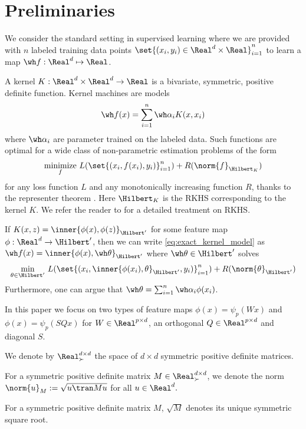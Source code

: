 \documentclass{article}
\def\cite{\citep}
\theoremstyle{plain}
\begin{document}
\section{Preliminaries}
\label{sec:prelim}

We consider the standard setting in supervised learning where we are provided with $n$ labeled training data points $\set{(x_i,y_i)\in\Real^d\times \Real}_{i=1}^n$ to learn a map $\wh f:\Real^d\mapsto\Real$.

A kernel $K:\Real^d\times \Real^d\to\Real$ is a bivariate, symmetric, positive definite function. Kernel machines are models
\begin{align}\label{eq:exact_kernel_model}
    \wh f(x)=\sum_{i=1}^n\wh\alpha_i K(x,x_i)
\end{align}
where $\wh\alpha_i$ are parameter trained on the labeled data.
Such functions are optimal for a wide class of non-parametric estimation problems of the form
\begin{align}\label{eq:representer_theorem}
\underset{f}{\text{minimize}}~ L(\set{(x_i,f(x_i),y_i)}_{i=1}^n) + R(\norm{f}_{\Hilbert_K})
\end{align}
for any loss function $L$ and any monotonically increasing function $R$, thanks to the representer theorem \cite{kimeldorf1971some,scholkopf2001generalized}. Here $\Hilbert_K$ is the RKHS corresponding to the kernel $K$. We refer the reader to \cite{steinwart2008support} for a detailed treatment on RKHS. 

If $K(x,z)=\inner{\phi(x),\phi(z)}_{\Hilbert'}$ for some feature map $ \phi:\Real^d\to\Hilbert'$, then we can write \cref{eq:exact_kernel_model} as $\wh f(x)=\inner{\phi(x),\wh\theta}_{\Hilbert'}$
where $\wh\theta\in\Hilbert'$ solves
\begin{align}\label{eq:featurized_glm}
    \underset{\theta\in\Hilbert'}{\text{min}}~ L(\set{(x_i,\inner{\phi(x_i),\theta}_{\Hilbert'},y_i)}_{i=1}^n) + R(\norm{\theta}_{\Hilbert'})
\end{align}
Furthermore, one can argue that $\wh\theta = \sum_{i=1}^n \wh\alpha_i\phi(x_i)$.

In this paper we focus on two types of feature maps $\phi(x)=\psi_p(Wx)$ and $\phi(x)=\psi_p(SQx)$ for  $W\in\Real^{p\times d}$, an orthogonal $Q\in\Real^{p\times d}$ and diagonal $S.$

We denote by $\Real^{d\times d}_\succ$ the space of $d\times d$ symmetric positive definite matrices.
\begin{definition}
    For a symmetric positive definite matrix $M\in\Real^{d\times d}_{\succ}$, we denote the norm $\norm{u}_M:=\sqrt{u\tran Mu}$ for all $u\in\Real^d.$
\end{definition}
For a symmetric positive definite matrix $M$,  $\sqrt{\!M}$ denotes its unique symmetric square root.
\end{document}

